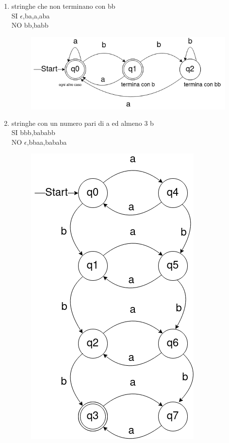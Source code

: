 \begin{enumerate}
\newpage
\item stringhe che non terminano con bb
\\ SI $\epsilon$,ba,a,aba
\\ NO bb,babb

\begin{figure}[h]
  \includegraphics[scale = 0.5]{media/09_21_es3.png}
  \centering
\end{figure}

\newpage
\item stringhe con un numero pari di a ed almeno 3 b
\\ SI bbb,bababb
\\ NO $\epsilon$,bbaa,bababa

\begin{figure}[h]
  \includegraphics[scale = 0.5]{media/09_21_es4.png}
  \centering
\end{figure}


\end{enumerate}
